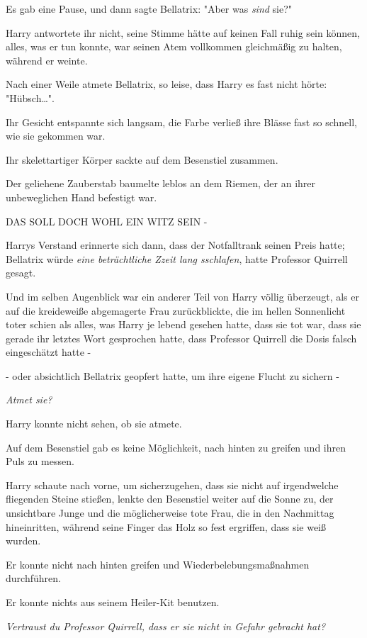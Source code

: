 {Es gab eine Pause, und dann sagte Bellatrix: "Aber was \emph{sind} sie?"

Harry antwortete ihr nicht, seine Stimme hätte auf keinen Fall ruhig sein können, alles, was er tun konnte, war seinen Atem vollkommen gleichmäßig zu halten, während er weinte.

Nach einer Weile atmete Bellatrix, so leise, dass Harry es fast nicht hörte: "Hübsch…".

Ihr Gesicht entspannte sich langsam, die Farbe verließ ihre Blässe fast so schnell, wie sie gekommen war.

Ihr skelettartiger Körper sackte auf dem Besenstiel zusammen.

Der geliehene Zauberstab baumelte leblos an dem Riemen, der an ihrer unbeweglichen Hand befestigt war.

DAS SOLL DOCH WOHL EIN WITZ SEIN -

Harrys Verstand erinnerte sich dann, dass der Notfalltrank seinen Preis hatte; Bellatrix würde \emph{eine beträchtliche Zzeit lang sschlafen}, hatte Professor Quirrell gesagt.

Und im selben Augenblick war ein anderer Teil von Harry völlig überzeugt, als er auf die kreideweiße abgemagerte Frau zurückblickte, die im hellen Sonnenlicht toter schien als alles, was Harry je lebend gesehen hatte, dass sie tot war, dass sie gerade ihr letztes Wort gesprochen hatte, dass Professor Quirrell die Dosis falsch eingeschätzt hatte -

- oder absichtlich Bellatrix geopfert hatte, um ihre eigene Flucht zu sichern -

\emph{\emph{Atmet sie?}}

Harry konnte nicht sehen, ob sie atmete.

Auf dem Besenstiel gab es keine Möglichkeit, nach hinten zu greifen und ihren Puls zu messen.

Harry schaute nach vorne, um sicherzugehen, dass sie nicht auf irgendwelche fliegenden Steine stießen, lenkte den Besenstiel weiter auf die Sonne zu, der unsichtbare Junge und die möglicherweise tote Frau, die in den Nachmittag hineinritten, während seine Finger das Holz so fest ergriffen, dass sie weiß wurden.

Er konnte nicht nach hinten greifen und Wiederbelebungsmaßnahmen durchführen.

Er konnte nichts aus seinem Heiler-Kit benutzen.

\emph{\emph{Vertraust du Professor Quirrell, dass er sie nicht in Gefahr gebracht hat?}}

}
